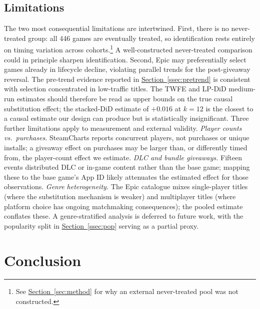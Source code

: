 \documentclass[11pt]{article}
\newcommand{\secref}[1]{\hyperref[#1]{Section~\ref*{#1}}}
\begin{document}
\subsection{Limitations}

The two most consequential limitations are intertwined. First, there is no
never-treated group: all 446 games are eventually treated, so identification
rests entirely on timing variation across cohorts.\footnote{See
\secref{sec:method} for why an external never-treated pool was not
constructed.} A well-constructed never-treated comparison could in principle
sharpen identification.
Second, Epic may preferentially select games already in lifecycle
decline, violating parallel trends for the post-giveaway reversal. The
pre-trend evidence reported in \secref{ssec:pretrend} is consistent with
selection concentrated in low-traffic titles. The TWFE and LP-DiD medium-run estimates
should therefore be read as upper bounds on the true causal substitution
effect; the stacked-DiD estimate of $+0.016$ at $k = 12$ is the closest to a
causal estimate our design can produce but is statistically insignificant.
Three further limitations apply to measurement and external validity.
\textit{Player counts vs.\ purchases.} SteamCharts reports concurrent players,
not purchases or unique installs; a giveaway effect on purchases may be larger
than, or differently timed from, the player-count effect we estimate.
\textit{DLC and bundle giveaways.} Fifteen events distributed DLC or in-game
content rather than the base game; mapping these to the base game's App ID
likely attenuates the estimated effect for those observations.
\textit{Genre heterogeneity.} The Epic catalogue mixes single-player titles
(where the substitution mechanism is weaker) and multiplayer titles (where
platform choice has ongoing matchmaking consequences); the pooled estimate
conflates these. A genre-stratified analysis is deferred to future work, with
the popularity split in \secref{ssec:pop} serving as a partial proxy.

\section{Conclusion}
\label{sec:conclusion}
\end{document}
